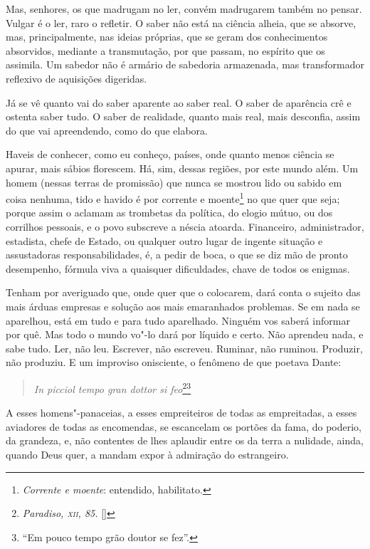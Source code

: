 Mas, senhores, os que madrugam no ler, convém madrugarem também no
pensar. Vulgar é o ler, raro o refletir. O saber não está na ciência
alheia, que se absorve, mas, principalmente, nas ideias próprias, que
se geram dos conhecimentos absorvidos, mediante a transmutação, por que
passam, no espírito que os assimila. Um sabedor não é armário de
sabedoria armazenada, mas transformador reflexivo de aquisições digeridas.

Já se vê quanto vai do saber aparente ao saber real. O saber de
aparência crê e ostenta saber tudo. O saber de realidade, quanto mais
real, mais desconfia, assim do que vai apreendendo, como do que elabora.

Haveis de conhecer, como eu conheço, países, onde quanto menos
ciência se apurar, mais sábios florescem. Há, sim, dessas regiões, por
este mundo além. Um homem (nessas terras de promissão) que nunca se
mostrou lido ou sabido em coisa nenhuma, tido e havido é por corrente e
moente\footnote{\textit{Corrente e moente}: entendido, habilitato.} no que quer que seja; porque assim o aclamam as trombetas
da política, do elogio mútuo, ou dos corrilhos pessoais, e o povo
subscreve a néscia atoarda. Financeiro, administrador, estadista, chefe
de Estado, ou qualquer outro lugar de ingente situação e assustadoras
responsabilidades, é, a pedir de boca, o que se diz mão de pronto
desempenho, fórmula viva a quaisquer dificuldades, chave de todos os enigmas.

Tenham por averiguado que, onde quer que o colocarem, dará conta o
sujeito das mais árduas empresas e solução aos mais emaranhados
problemas. Se em nada se aparelhou, está em tudo e para tudo
aparelhado. Ninguém vos saberá informar por quê. Mas todo o mundo vo"-lo
dará por líquido e certo. Não aprendeu nada, e sabe tudo. Ler, não leu.
Escrever, não escreveu. Ruminar, não ruminou. Produzir, não produziu. E
um improviso onisciente, o fenômeno de que poetava Dante:

\begin{verse}
\textit{In picciol tempo gran dottor si feo}\footnote[*]{\emph{Paradiso, \textsc{xii}, 85.} []}\footnote{``Em pouco tempo grão doutor se fez''.}
\end{verse}
 

A esses homens"-panaceias, a esses empreiteiros de todas as
empreitadas, a esses aviadores de todas as encomendas, se escancelam os
portões da fama, do poderio, da grandeza, e, não contentes de lhes
aplaudir entre os da terra a nulidade, ainda, quando Deus quer, a
mandam expor à admiração do estrangeiro.

